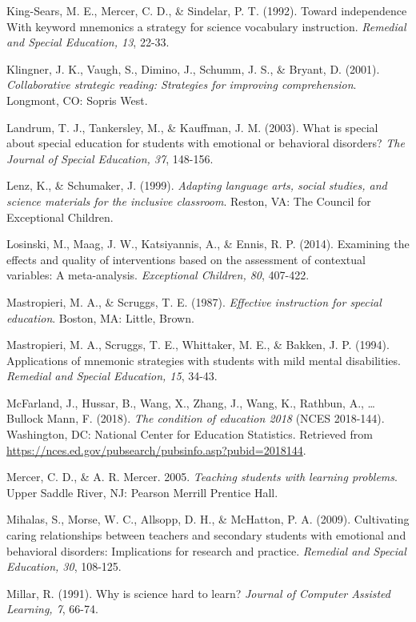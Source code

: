 \documentclass[11.5pt]{sig-alternate} %
\begin{document}
King-Sears, M. E., Mercer, C. D., \& Sindelar, P. T. (1992). Toward independence With keyword mnemonics a strategy for science vocabulary instruction. \textit{Remedial and Special Education, 13}, 22-33.

Klingner, J. K., Vaugh, S., Dimino, J., Schumm, J. S., \& Bryant, D. (2001). \textit{Collaborative strategic reading: Strategies for improving comprehension}. Longmont, CO: Sopris West.

Landrum, T. J., Tankersley, M., \& Kauffman, J. M. (2003). What is special about special education for students with emotional or behavioral disorders? \textit{The Journal of Special Education, 37}, 148-156.

Lenz, K., \& Schumaker, J. (1999). \textit{Adapting language arts, social studies, and science materials for the inclusive classroom}. Reston, VA: The Council for Exceptional Children.

Losinski, M., Maag, J. W., Katsiyannis, A., \& Ennis, R. P. (2014). Examining the effects and quality of interventions based on the assessment of contextual variables: A meta-analysis. \textit{Exceptional Children, 80}, 407-422.

Mastropieri, M. A., \& Scruggs, T. E. (1987). \textit{Effective instruction for special education}. Boston, MA: Little, Brown.

Mastropieri, M. A., Scruggs, T. E., Whittaker, M. E., \& Bakken, J. P. (1994). Applications of mnemonic strategies with students with mild mental disabilities. \textit{Remedial and Special Education, 15}, 34-43.

McFarland, J., Hussar, B., Wang, X., Zhang, J., Wang, K., Rathbun, A., … Bullock Mann, F. (2018).  \textit{The condition of education 2018} (NCES 2018-144). Washington, DC: National Center for Education Statistics. Retrieved from \url{https://nces.ed.gov/pubsearch/pubsinfo.asp?pubid=2018144}.

Mercer, C. D., \& A. R. Mercer. 2005. \textit{Teaching students with learning problems}. Upper Saddle River, NJ: Pearson Merrill Prentice Hall. 

Mihalas, S., Morse, W. C., Allsopp, D. H., \& McHatton, P. A. (2009).  Cultivating caring relationships between teachers and secondary students with emotional and behavioral disorders: Implications for research and practice.  \textit{Remedial and Special Education, 30}, 108-125. 

Millar, R. (1991). Why is science hard to learn? \textit{Journal of Computer Assisted Learning, 7}, 66-74.
\end{document}
